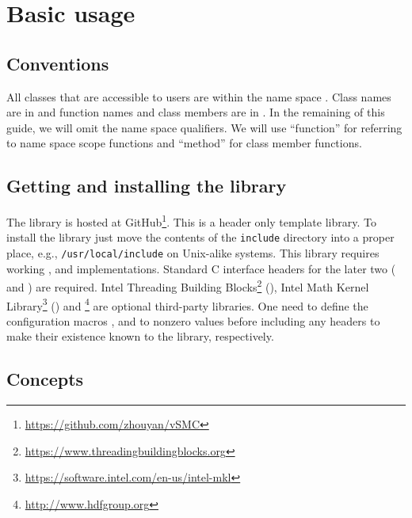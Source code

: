 \chapter{Basic usage}
\label{chap:Basic usage}

\section{Conventions}
\label{sec:Conventions}

All classes that are accessible to users are within the name space
. Class names are in  and function names
and class members are in . In the remaining of this
guide, we will omit the  name space qualifiers. We will use
``function'' for referring to name space scope functions and ``method'' for
class member functions.

\section{Getting and installing the library}
\label{sec:Getting and installing the library}

The library is hosted at
GitHub\footnote{\url{https://github.com/zhouyan/vSMC}}. This is a header only
\cpp template library. To install the library just move the contents of the
\texttt{include} directory into a proper place, e.g.,
\texttt{/usr/local/include} on Unix-alike systems. This library requires
working \cppoo, \blas and \lapack implementations. Standard C interface headers
for the later two ( and ) are required.
Intel Threading Building
Blocks\footnote{\url{https://www.threadingbuildingblocks.org}} (\tbb), Intel
Math Kernel Library\footnote{\url{https://software.intel.com/en-us/intel-mkl}}
(\mkl) and \hdf\footnote{\url{http://www.hdfgroup.org}} are optional
third-party libraries. One need to define the configuration macros
,  and
 to nonzero values before including any \vsmc headers
to make their existence known to the library, respectively.

\section{Concepts}
\label{sec:Concepts}

